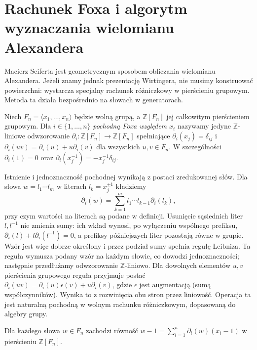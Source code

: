 \section{Rachunek Foxa i algorytm wyznaczania wielomianu Alexandera}
\label{sec:kt-fox-calculus}

Macierz Seiferta jest geometrycznym sposobem obliczania
wielomianu Alexandera. Jeżeli znamy jednak prezentację
Wirtingera, nie musimy konstruować powierzchni: wystarcza
specjalny rachunek różniczkowy w pierścieniu grupowym.
Metoda ta działa bezpośrednio na słowach w generatorach.

\begin{definicja}
Niech $F_n=\langle x_1,\dots,x_n\rangle$ będzie wolną grupą,
a $\mathbb Z[F_n]$ jej całkowitym pierścieniem grupowym.
Dla $i\in\{1,\dots,n\}$ \emph{pochodną Foxa względem $x_i$}
nazywamy jedyne $\mathbb Z$-liniowe odwzorowanie
$\partial_i\colon\mathbb Z[F_n]\to\mathbb Z[F_n]$
spełniające $\partial_i(x_j)=\delta_{ij}$ i
$\partial_i(uv)=\partial_i(u)+u\partial_i(v)$
dla wszystkich $u,v\in F_n$. W szczególności
$\partial_i(1)=0$ oraz
$\partial_i(x_j^{-1})=-x_j^{-1}\delta_{ij}$.
\end{definicja}

Istnienie i jednoznaczność pochodnej wynikają z postaci
zredukowanej słów. Dla słowa $w=l_1\cdots l_m$ w literach
$l_k=x_j^{\pm1}$ kładziemy
\[
\partial_i(w)=\sum_{k=1}^m l_1\cdots l_{k-1}\partial_i(l_k),
\]
przy czym wartości na literach są podane w definicji.
Usunięcie sąsiednich liter $l,l^{-1}$ nie zmienia sumy:
ich wkład wynosi, po wyłączeniu wspólnego prefiksu,
$\partial_i(l)+l\partial_i(l^{-1})=0$,
a prefiksy późniejszych liter pozostają równe w grupie.
Wzór jest więc dobrze określony i przez podział sumy
spełnia regułę Leibniza. Ta reguła wymusza podany wzór
na każdym słowie, co dowodzi jednoznaczności;
następnie przedłużamy odwzorowanie $\mathbb Z$-liniowo.
Dla dowolnych elementów $u,v$ pierścienia grupowego
reguła przyjmuje postać
$\partial_i(uv)=\partial_i(u)\epsilon(v)+u\partial_i(v)$,
gdzie $\epsilon$ jest augmentacją (sumą współczynników).
Wynika to z rozwinięcia obu stron przez liniowość. Operacja ta jest naturalną
pochodną w wolnym rachunku różniczkowym, dopasowaną
do algebry grupy.

\begin{lemat}
Dla każdego słowa $w\in F_n$ zachodzi równość
$w-1=\sum_{i=1}^n\partial_i(w)(x_i-1)$
w pierścieniu $\mathbb Z[F_n]$.
\end{lemat}

